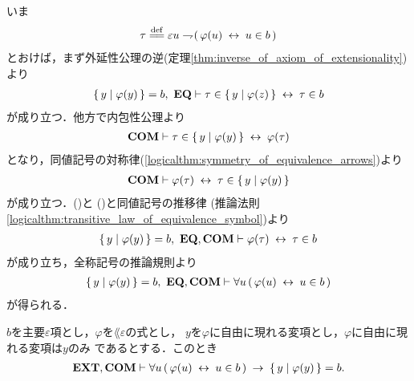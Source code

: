 	\begin{sketch}
		いま
		\begin{align}
			\tau \defeq \varepsilon u \negation (\, \varphi(u) \lrarrow u \in b\, )
		\end{align}
		とおけば，まず外延性公理の逆(定理\ref{thm:inverse_of_axiom_of_extensionality})より
		\begin{align}
			\left\{\, y \mid \varphi(y)\, \right\} = b,\ \mbox{{\bf EQ}} \vdash 
			\tau \in \left\{\, y \mid \varphi(z)\, \right\} \hspace{0.25em}\leftrightarrow\hspace{0.25em} \tau \in b
			\label{fom:equivalent_formula_rewriting_3_1}
		\end{align}
		が成り立つ．他方で内包性公理より
		\begin{align}
			\mbox{\bf COM} \vdash \tau \in \left\{\, y \mid \varphi(y)\, \right\} \hspace{0.25em}\leftrightarrow\hspace{0.25em} \varphi(\tau)
		\end{align}
		となり，同値記号の対称律(\ref{logicalthm:symmetry_of_equivalence_arrows})より
		\begin{align}
			\mbox{\bf COM} \vdash \varphi(\tau) \hspace{0.25em}\leftrightarrow\hspace{0.25em} \tau \in \left\{\, y \mid \varphi(y)\, \right\}
			\label{fom:equivalent_formula_rewriting_3_2}
		\end{align}
		が成り立つ．()と
		()と同値記号の推移律
		(推論法則\ref{logicalthm:transitive_law_of_equivalence_symbol})より
		\begin{align}
			\left\{\, y \mid \varphi(y)\, \right\} = b,\ \mbox{{\bf EQ}},\mbox{\bf COM} \vdash 
			\varphi(\tau) \hspace{0.25em}\leftrightarrow\hspace{0.25em} \tau \in b 
		\end{align}
		が成り立ち，全称記号の推論規則より
		\begin{align}
			\left\{\, y \mid \varphi(y)\, \right\} = b,\ \mbox{{\bf EQ}},\mbox{\bf COM} \vdash 
			\forall u\, (\, \varphi(u) \hspace{0.25em}\leftrightarrow\hspace{0.25em} u \in b\, )
		\end{align}
		が得られる．
		\QED
	\end{sketch}
	
	\begin{screen}
		\begin{thm}
		\label{thm:equivalent_formula_rewriting_4}
			$b$を主要$\varepsilon$項とし，$\varphi$を$\lang{\varepsilon}$の式とし，
			$y$を$\varphi$に自由に現れる変項とし，$\varphi$に自由に現れる変項は$y$のみ
			であるとする．このとき
			\begin{align}
				\mbox{{\bf EXT}},\mbox{\bf COM} \vdash \forall u\, (\, \varphi(u) \hspace{0.25em}\leftrightarrow\hspace{0.25em} u \in b\, )
				\hspace{0.25em}\rightarrow\hspace{0.25em} \left\{\, y \mid \varphi(y)\, \right\} = b.
			\end{align}
		\end{thm}
	\end{screen}
	
